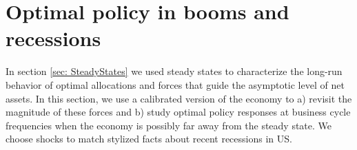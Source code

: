 \documentclass[thmsb,11pt]{article}
\begin{document}
%
%


\section{\protect\smallskip Optimal policy in booms and recessions}\label{Sec: numerical}

\smallskip

In section \ref{sec: SteadyStates} we used steady states to characterize the long-run behavior of optimal allocations and forces that guide the asymptotic level of net assets. In this section, we use a calibrated version of the economy to a) revisit the magnitude of these forces and b) study optimal policy responses at business cycle frequencies when the economy is possibly far away from the steady state. We choose shocks to match stylized facts about recent
recessions in US.



%




%
\end{document}
